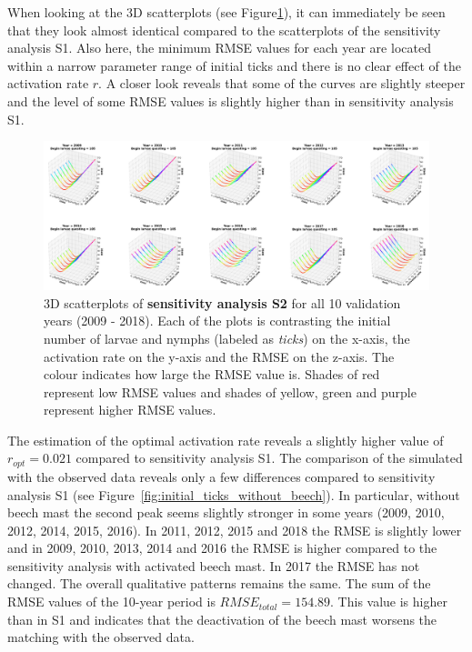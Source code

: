 \documentclass[a4paper, 11pt]{scrartcl}
\begin{document}
When looking at the 3D scatterplots (see Figure\ref{fig:initial_ticks_without_beech_error}), it can immediately be seen that they look almost identical compared to the
scatterplots of the sensitivity analysis S1. Also here, the minimum RMSE values for each year are located within a narrow parameter range of initial ticks and there is no clear
effect of the activation rate $r$. A closer look reveals that some of the curves are slightly steeper and the level of some RMSE values is slightly higher than in sensitivity
analysis S1.

\begin{figure}[h!]
\centering
\includegraphics[width=\linewidth]{figures/initial_ticks_without_beech_error}
\caption{3D scatterplots of \textbf{sensitivity analysis S2} for all 10 validation years (2009 - 2018). Each of the plots is contrasting the initial number of larvae and nymphs
(labeled as \textit{ticks}) on the x-axis, the activation rate on the y-axis and the RMSE on the z-axis. The colour indicates how large the RMSE value is. Shades of red
represent low RMSE values and shades of yellow, green and purple represent higher RMSE values.}
\label{fig:initial_ticks_without_beech_error}
\end{figure}

The estimation of the optimal activation rate reveals a slightly higher value of $r_{opt} = 0.021$ compared to sensitivity analysis S1. The comparison of the simulated with
the observed data reveals only a few differences compared to sensitivity analysis S1 (see Figure~\ref{fig:initial_ticks_without_beech}). In particular, without beech mast the
second peak seems slightly stronger in some years (2009, 2010, 2012, 2014, 2015, 2016). In 2011, 2012, 2015 and 2018 the RMSE is slightly lower and in 2009, 2010, 2013, 2014
and 2016 the RMSE is higher compared to the sensitivity analysis with activated beech mast. In 2017 the RMSE has not changed. The overall qualitative patterns remains
the same. The sum of the RMSE values of the 10-year period is $RMSE_{total} = 154.89$. This value is higher than in S1 and indicates that the deactivation of the beech mast
worsens the matching with the observed data.
\end{document}
